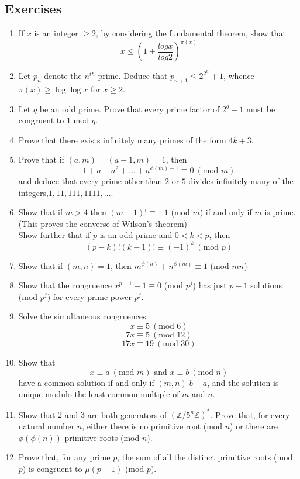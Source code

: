 \subsection{Exercises}
\begin{enumerate}
\item If $x$ is an integer $\ge 2$, by considering the fundamental theorem, show that
$$x \le \left(1+\frac{log{x}}{log{2}}\right)^{\pi(x)}$$ 
\item Let $p_n$ denote the $n^{th}$ prime. Deduce that $p_{n+1} \le 2^{2^n}+1$, whence $\pi(x) \ge \log{\log{x}}$ for $x \ge 2$.
\item Let $q$ be an odd prime. Prove that every prime factor of $2^q-1$ must be congruent to $1$ mod $q$.
\item Prove that there exists infinitely many primes of the form $4k+3$.
\item Prove that if $(a,m)=(a-1,m)=1$, then
$$1+ a +a^2 + \ldots +a^{\phi(m)-1} \equiv 0~(\text{mod } m)$$
and deduce that every prime other than $2$ or $5$ divides infinitely many of the integers,$1,11,111,1111, \ldots$.
\item Show that if $m>4$ then $(m-1)! \equiv -1$ (mod $m$) if and only if $m$ is prime. (This proves the converse of Wilson's theorem)\\
Show further that if $p$ is an odd prime and $0<k<p$, then
    $$(p-k)!(k-1)! \equiv (-1)^k~(\text{mod } p)$$
\item Show that if $(m,n)=1$, then $m^{\phi(n)}+n^{\phi(m)} \equiv 1$ (mod $mn$)
\item Show that the congruence $x^{p-1}-1 \equiv 0$ (mod $p^j$) has just $p-1$ solutions (mod $p^j$) for every prime power $p^j$.
\item Solve the simultaneous congruences:
$$x \equiv 5~(\text{mod } 6)$$
$$7x \equiv 5~(\text{mod } 12)$$
$$ 17x \equiv 19~(\text{mod } 30)$$
\item Show that
$$x \equiv a~(\text{mod } m) \text{ and } x \equiv b~(\text{mod } n)$$
have a common solution if and only if $(m,n)|b-a$, and the solution is unique modulo the least common multiple of $m$ and $n$.
\item Show that $2$ and $3$ are both generators of $(\mathbb{Z}/5^n\mathbb{Z})^*$. Prove that, for every natural number $n$, either there is no primitive root (mod $n$) or there are $\phi(\phi(n))$ primitive roots (mod $n$).
\item Prove that, for any prime $p$, the sum of all the distinct primitive roots (mod $p$) is congruent to $\mu(p-1)$ (mod $p$).

\end{enumerate}
